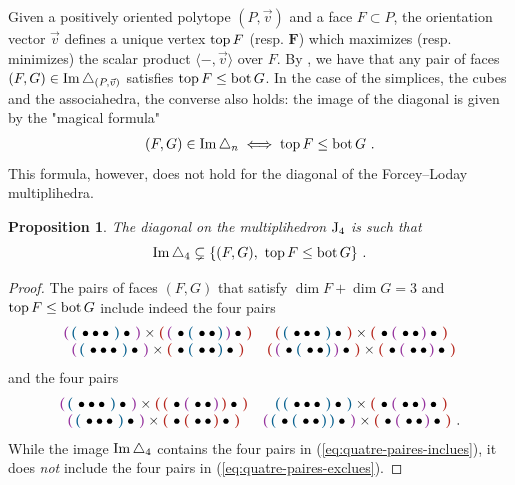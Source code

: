 \documentclass[twoside, 11pt]{amsart}
\newtheorem{proposition}[definition]{Proposition}
\theoremstyle{remark}
\begin{document}
Given a positively oriented polytope $(P, \vec v)$ and a face $F \subset P$, the orientation vector $\vec v$ defines a unique vertex $\operatorname{top} F$ (resp. $\bm F$) which maximizes (resp. minimizes) the scalar product $\langle - , \vec v \rangle$ over $F$. 
By \cite[Proposition 1.15]{LA21}, we have that any pair of faces $(F,G) \in \operatorname{Im} \triangle_{(P,\vec v)}$ satisfies $\operatorname{top} F \leq \operatorname{bot} G$. 
In the case of the simplices, the cubes and the associahedra, the converse also holds: the image of the diagonal is given by the "magical formula" 
\begin{align}
\label{eq:magical-formula}
(F,G) \in \operatorname{Im} \triangle_n \iff \operatorname{top} F\leq \operatorname{bot} G \ . 
\end{align}
This formula, however, does not hold for the diagonal of the Forcey--Loday multiplihedra. 

\begin{proposition} \label{prop:pas-top-bot}
The diagonal on the multiplihedron $\mathrm{J}_4$ is such that
\[ \Ima \triangle_4 \subsetneq \{ (F,G) , \ \tp F\leq \bm G \} \ . \]
\end{proposition}
\begin{proof}
The pairs of faces $(F,G)$ that satisfy $\dim F + \dim G = 3$ and $\operatorname{top} F\leq \operatorname{bot} G$ include indeed the four pairs 
\begin{equation} \label{eq:quatre-paires-inclues}
\begin{matrix}
\purple{\blue{\bullet \bullet \bullet}\bullet} \times \red{\purple{\bullet\blue{\bullet\bullet}}\bullet} & 
\red{\blue{\bullet\bullet\bullet}\bullet} \times \red{\bullet\purple{\bullet\bullet}\bullet}  \\
\purple{\blue{\bullet\bullet\bullet}\bullet} \times \red{\bullet\blue{\bullet\bullet}\bullet} &
\red{\purple{\bullet\blue{\bullet\bullet}}\bullet} \times \red{\bullet\purple{\bullet\bullet}\bullet}  
\end{matrix}
\end{equation}
and the four pairs
\begin{equation} \label{eq:quatre-paires-exclues}
\begin{matrix}
\purple{\blue{\bullet \bullet \bullet}\bullet} \times \red{\red{\bullet\purple{\bullet\bullet}}\bullet} & 
\blue{\blue{\bullet\bullet\bullet}\bullet} \times \red{\bullet\purple{\bullet\bullet}\bullet}  \\
\purple{\blue{\bullet\bullet\bullet}\bullet} \times \red{\bullet\red{\bullet\bullet}\bullet} &
\purple{\blue{\bullet\blue{\bullet\bullet}}\bullet} \times \red{\bullet\purple{\bullet\bullet}\bullet}  \ .
\end{matrix}
\end{equation}
While the image $\operatorname{Im} \triangle_4$ contains the four pairs in (\ref{eq:quatre-paires-inclues}), it does \emph{not} include the four pairs in (\ref{eq:quatre-paires-exclues}).
\end{proof}
\end{document}
